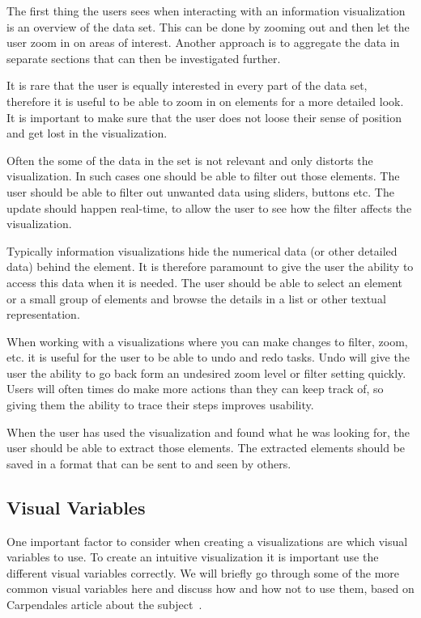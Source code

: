 The first thing the users sees when interacting with an information visualization is an overview of the data set. This can be done by zooming out and then let the user zoom in on areas of interest. Another approach is to aggregate the data in separate sections that can then be investigated further.

It is rare that the user is equally interested in every part of the data set, therefore it is useful to be able to zoom in on elements for a more detailed look. It is important to make sure that the user does not loose their sense of position and get lost in the visualization.

Often the some of the data in the set is not relevant and only distorts the visualization. In such cases one should be able to filter out those elements. The user should be able to filter out unwanted data using sliders, buttons etc. The update should happen real-time, to allow the user to see how the filter affects the visualization. 

Typically information visualizations hide the numerical data (or other detailed data) behind the element. It is therefore paramount to give the user the ability to access this data when it is needed. The user should be able to select an element or a small group of elements and browse the details in a list or other textual representation.

When working with a visualizations where you can make changes to filter, zoom, etc. it is useful for the user to be able to undo and redo tasks. Undo will give the user the ability to go back form an undesired zoom level or filter setting quickly. Users will often times do make more actions than they can keep track of, so giving them the ability to trace their steps improves usability.

When the user has used the visualization and found what he was looking for, the user should be able to extract those elements. The extracted elements should be saved in a format that can be sent to and seen by others. 


\subsection{Visual Variables} 
One important factor to consider when creating a visualizations are which visual variables to use. To create an intuitive visualization it is important use the different visual variables correctly. We will briefly go through some of the more common visual variables here and discuss how and how not to use them, based on Carpendales article about the subject~\cite{carpendale}.

